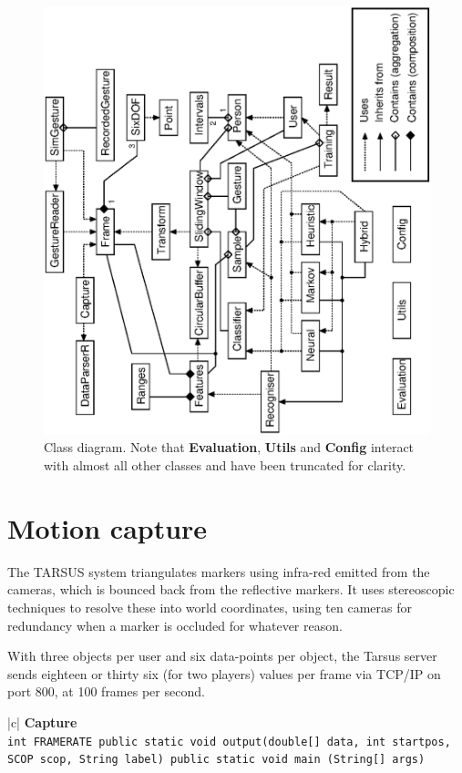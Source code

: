 \documentclass[12pt,a4,notitlepage]{report}
\renewcommand{\_}{\texttt{\symbol{95}}}
\newcommand{\<}{\texttt{\symbol{60}}}
\renewcommand{\>}{\texttt{\symbol{62}}}
\newcommand{\class}[1]{\textbf{#1}}
\newcommand{\variable}[1]{\texttt{#1}}
\begin{document}
\begin{figure}
\centering
\includegraphics[scale=1.25,angle=-90]{diagrams/classes.eps}
\caption{Class diagram. Note that \class{Evaluation}, \class{Utils} and \class{Config} interact with almost all other classes and have been truncated for clarity.}
\label{classdiag}
\end{figure}

\section{Motion capture}

The TARSUS system triangulates markers using infra-red emitted from the cameras, which is bounced back from the reflective markers. It uses stereoscopic techniques to resolve these into world coordinates, using ten cameras for redundancy when a marker is occluded for whatever reason.

With three objects per user and six data-points per object, the Tarsus server sends eighteen or thirty six (for two players) values per frame via TCP/IP on port 800, at 100 frames per second.

\begin{tabular}{|c|} \hline 
\class{Capture} \\ \hline
{}
{ \variable{int FRAME\_RATE \newline
public static void output(double[] data, int startpos, SCOP scop, String label) \newline
public static void main (String[] args)
} } \\ \hline
\end{tabular}
\end{document}
